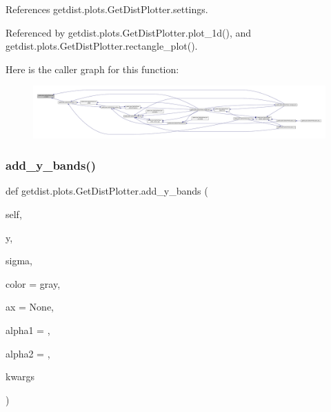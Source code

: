 References getdist.\+plots.\+Get\+Dist\+Plotter.\+settings.



Referenced by getdist.\+plots.\+Get\+Dist\+Plotter.\+plot\+\_\+1d(), and getdist.\+plots.\+Get\+Dist\+Plotter.\+rectangle\+\_\+plot().

Here is the caller graph for this function\+:
\nopagebreak
\begin{figure}[H]
\begin{center}
\leavevmode
\includegraphics[width=350pt]{classgetdist_1_1plots_1_1GetDistPlotter_a91bd8b0085aa1366a6cb6e8d329da5c4_icgraph}
\end{center}
\end{figure}
\mbox{\label{classgetdist_1_1plots_1_1GetDistPlotter_ad7176db0b45488015840ae2e1a87162c}} 
\subsubsection{\texorpdfstring{add\+\_\+y\+\_\+bands()}{add\_y\_bands()}}
{\footnotesize\ttfamily def getdist.\+plots.\+Get\+Dist\+Plotter.\+add\+\_\+y\+\_\+bands (\begin{DoxyParamCaption}\item[{}]{self,  }\item[{}]{y,  }\item[{}]{sigma,  }\item[{}]{color = {\ttfamily \textquotesingle{}gray\textquotesingle{}},  }\item[{}]{ax = {\ttfamily None},  }\item[{}]{alpha1 = {},  }\item[{}]{alpha2 = {},  }\item[{}]{kwargs }\end{DoxyParamCaption})}

